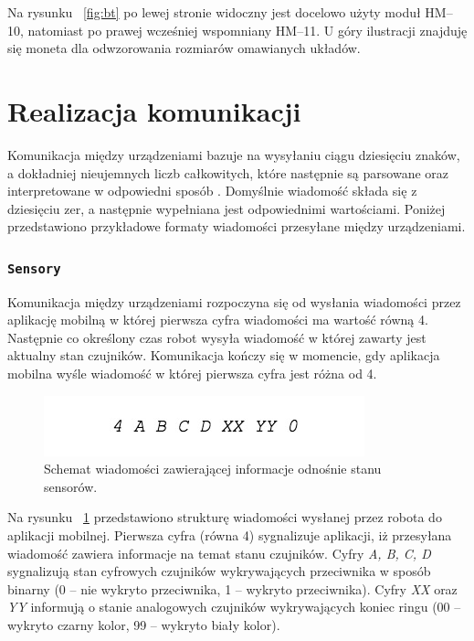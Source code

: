 Na rysunku ~\ref{fig:bt} po lewej stronie widoczny jest docelowo użyty moduł HM–10, natomiast po prawej wcześniej wspomniany HM–11. U góry ilustracji znajduję się moneta dla odwzorowania rozmiarów omawianych układów.

\section{Realizacja komunikacji}
Komunikacja między urządzeniami bazuje na wysyłaniu ciągu dziesięciu znaków, a dokładniej nieujemnych liczb całkowitych, które następnie są parsowane oraz interpretowane w odpowiedni sposób \cite{Forbot}. Domyślnie wiadomość składa się z dziesięciu zer, a następnie wypełniana jest odpowiednimi wartościami. Poniżej przedstawiono przykładowe formaty wiadomości przesyłane między urządzeniami.

 \subsubsection{\lstinline$Sensory$}
Komunikacja między urządzeniami rozpoczyna się od wysłania wiadomości przez aplikację mobilną w której pierwsza cyfra wiadomości ma wartość równą 4. Następnie co określony czas robot wysyła wiadomość w której zawarty jest aktualny stan czujników. Komunikacja kończy się w momencie, gdy aplikacja mobilna wyśle wiadomość w której pierwsza cyfra jest różna od 4.

\begin{figure}[H]
	\centering
		\includegraphics[width=0.75\linewidth]{pic03/sensors.jpg}
	\caption{Schemat wiadomości zawierającej informacje odnośnie stanu sensorów.}
	\label{fig:sensors_communication}	
\end{figure}

Na rysunku ~\ref{fig:sensors_communication} przedstawiono strukturę wiadomości wysłanej przez robota do aplikacji mobilnej. Pierwsza cyfra (równa 4) sygnalizuje aplikacji, iż przesyłana wiadomość zawiera informacje na temat stanu czujników. Cyfry \textit{A, B, C, D} sygnalizują stan cyfrowych czujników wykrywających przeciwnika w sposób binarny (0 – nie wykryto przeciwnika, 1 – wykryto przeciwnika). Cyfry \textit{XX} oraz \textit{YY} informują o stanie analogowych czujników wykrywających koniec ringu (00 – wykryto czarny kolor, 99 – wykryto biały kolor).

